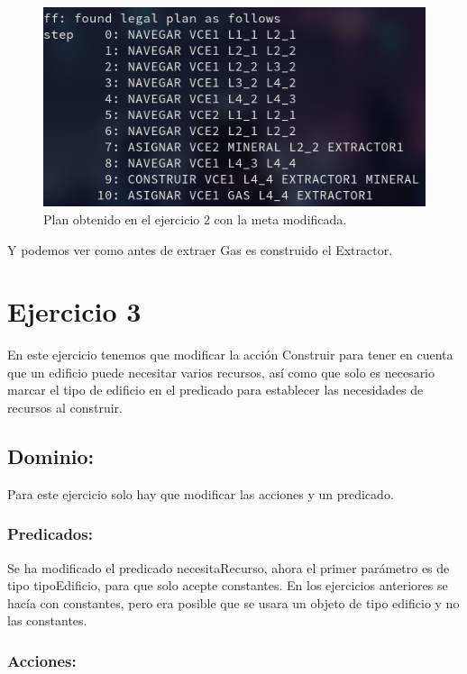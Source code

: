 \documentclass[11pt, spanish]{article}
\begin{document}
\begin{figure}[H]
	\centering
	\includegraphics[scale=0.4]{plan2Gas.png}
	\caption{Plan obtenido en el ejercicio 2 con la meta modificada.}
	\label{plan2Gas}
\end{figure}

Y podemos ver como antes de extraer Gas es construido el Extractor.

\section{Ejercicio 3}

En este ejercicio tenemos que modificar la acción Construir para tener en cuenta que un edificio puede necesitar varios recursos, así como que solo es necesario marcar el tipo de edificio en el predicado para establecer las necesidades de recursos al construir.

\subsection{Dominio:}

Para este ejercicio solo hay que modificar las acciones y un predicado.

\subsubsection{Predicados:}

Se ha modificado el predicado necesitaRecurso, ahora el primer parámetro es de tipo tipoEdificio, para que solo acepte constantes. En los ejercicios anteriores se hacía con constantes, pero era posible que se usara un objeto de tipo edificio y no las constantes.

\subsubsection{Acciones:}
\end{document}
